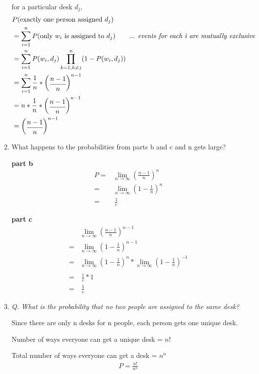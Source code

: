 \documentclass{homeworg}
\begin{document}
\begin{enumerate}[label=\alph*)]
    for a particular desk $d_j$,
    \begin{align*}
        & P(\text{exactly one person assigned}\ d_j) \\
        & = \sum_{i = 1}^{n} P(\text{only } w_i \text{ is assigned to}\ d_j) \qquad  \text{... \textit{events for each i are mutually exclusive}} \\
        & = \sum_{i = 1}^{n} P(w_i, d_j) \prod_{k=1, k \ne j}^n (1- P(w_i, d_j))\\
        & = \sum_{i = 1}^{n} \frac{1}{n} \ast 
            \begin{pmatrix}
                \cfrac{n-1}{n}
            \end{pmatrix}^{n-1}\\
        & = n 
            \ast  \frac{1}{n} 
            \ast 
            \begin{pmatrix}
                \cfrac{n-1}{n}
            \end{pmatrix}^{n-1}\\
        & = \begin{pmatrix}
                \cfrac{n-1}{n}
            \end{pmatrix}^{n-1}
    \end{align*}
 
    \item What happens to the probabilities from parts b and c and n gets large?
    
    \textbf{part b}
    \begin{align*}
        P = & \lim_{n \to \infty} \left( \frac{n-1}{n} \right)^n \\
        =& \lim_{n \to \infty} \left( 1 -  \frac{1}{n} \right)^n \\
        =& \ \frac{1}{e} \label{eq}
    \end{align*}
    
    \textbf{part c}
    \begin{align*}
        & \lim_{n \to \infty} \left( \frac{n-1}{n} \right)^{n-1} \\
        =& \lim_{n \to \infty} \left( 1 -  \frac{1}{n} \right)^{n-1} \\
        =& \lim_{n \to \infty} \left( 1 -  \frac{1}{n} \right)^{n} 
        \ast \lim_{n \to \infty} \left( 1 -  \frac{1}{n} \right)^{-1} \\\\
        =& \ \frac{1}{e} \ast 1 \\
        =&\ \frac{1}{e}
    \end{align*}
    
    \item \emph{Q. What is the probability that no two people are assigned to the same desk?}
    
    Since there are only n desks for n people, each person gets one unique desk.
    
    Number of ways everyone can get a unique desk = $n!$
    
    Total number of ways everyone can get a desk = $n^n$
    \begin{align*}
    P = \frac{n!}{n^n}
    \end{align*}
    
\end{enumerate}
\end{document}
